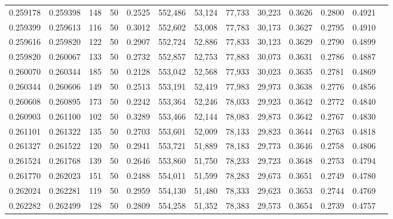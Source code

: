 \begin{tabular}{rrrrrrrrrrrrr}
0.259178 & 0.259398 &   148 &  50 &                                     0.2525 & 552,486 &  53,124 &  77,733 &  30,223 & 0.3626 & 0.2800 & 0.4921 \\
0.259399 & 0.259613 &   116 &  50 &                                     0.3012 & 552,602 &  53,008 &  77,783 &  30,173 & 0.3627 & 0.2795 & 0.4910 \\
0.259616 & 0.259820 &   122 &  50 &                                     0.2907 & 552,724 &  52,886 &  77,833 &  30,123 & 0.3629 & 0.2790 & 0.4899 \\
0.259820 & 0.260067 &   133 &  50 &                                     0.2732 & 552,857 &  52,753 &  77,883 &  30,073 & 0.3631 & 0.2786 & 0.4887 \\
0.260070 & 0.260344 &   185 &  50 &                                     0.2128 & 553,042 &  52,568 &  77,933 &  30,023 & 0.3635 & 0.2781 & 0.4869 \\
0.260344 & 0.260606 &   149 &  50 &                                     0.2513 & 553,191 &  52,419 &  77,983 &  29,973 & 0.3638 & 0.2776 & 0.4856 \\
0.260608 & 0.260895 &   173 &  50 &                                     0.2242 & 553,364 &  52,246 &  78,033 &  29,923 & 0.3642 & 0.2772 & 0.4840 \\
0.260903 & 0.261100 &   102 &  50 &                                     0.3289 & 553,466 &  52,144 &  78,083 &  29,873 & 0.3642 & 0.2767 & 0.4830 \\
0.261101 & 0.261322 &   135 &  50 &                                     0.2703 & 553,601 &  52,009 &  78,133 &  29,823 & 0.3644 & 0.2763 & 0.4818 \\
0.261327 & 0.261522 &   120 &  50 &                                     0.2941 & 553,721 &  51,889 &  78,183 &  29,773 & 0.3646 & 0.2758 & 0.4806 \\
0.261524 & 0.261768 &   139 &  50 &                                     0.2646 & 553,860 &  51,750 &  78,233 &  29,723 & 0.3648 & 0.2753 & 0.4794 \\
0.261770 & 0.262023 &   151 &  50 &                                     0.2488 & 554,011 &  51,599 &  78,283 &  29,673 & 0.3651 & 0.2749 & 0.4780 \\
0.262024 & 0.262281 &   119 &  50 &                                     0.2959 & 554,130 &  51,480 &  78,333 &  29,623 & 0.3653 & 0.2744 & 0.4769 \\
0.262282 & 0.262499 &   128 &  50 &                                     0.2809 & 554,258 &  51,352 &  78,383 &  29,573 & 0.3654 & 0.2739 & 0.4757 \\

\end{tabular}
